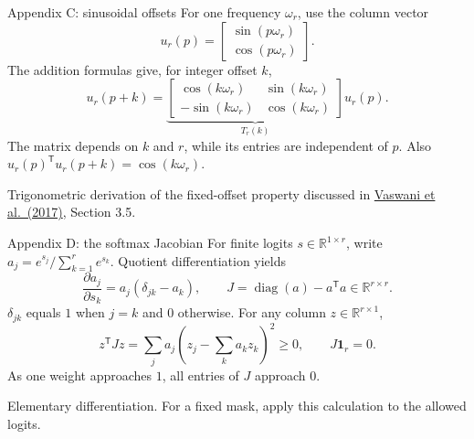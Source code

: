 \documentclass[aspectratio=169,11pt]{beamer}
\newcommand{\R}{\mathbb{R}}
\newcommand{\one}{\mathbf{1}}
\newcommand{\T}{\mathsf{T}}
\newcommand{\src}[1]{\par\vfill{\fontsize{7}{8.5}\selectfont\color{muted}#1}\par}
\newcommand{\paper}{\href{https://arxiv.org/abs/1706.03762}{Vaswani et al.\ (2017)}}
\DeclareMathOperator{\diag}{diag}
\begin{document}
\begin{frame}[t]{Appendix C: sinusoidal offsets}
For one frequency $\omega_r$, use the column vector
\[
 u_r(p)=\begin{bmatrix}\sin(p\omega_r)\\\cos(p\omega_r)\end{bmatrix}.
\]
The addition formulas give, for integer offset $k$,
\[
 u_r(p+k)=
 \underbrace{\begin{bmatrix}
 \cos(k\omega_r)&\sin(k\omega_r)\\
 -\sin(k\omega_r)&\cos(k\omega_r)
 \end{bmatrix}}_{T_r(k)}u_r(p).
\]
The matrix depends on $k$ and $r$, while its entries are independent of $p$.
Also $u_r(p)^{\T}u_r(p+k)=\cos(k\omega_r)$.
\src{Trigonometric derivation of the fixed-offset property discussed in \paper, Section 3.5.}
\end{frame}

\begin{frame}[t]{Appendix D: the softmax Jacobian}
For finite logits $s\in\R^{1\times r}$, write
$a_j=e^{s_j}/\sum_{k=1}^r e^{s_k}$. Quotient differentiation yields
\[
 \frac{\partial a_j}{\partial s_k}
   =a_j(\delta_{jk}-a_k),\qquad
 J=\diag(a)-a^{\T}a\in\R^{r\times r}.
\]
$\delta_{jk}$ equals $1$ when $j=k$ and $0$ otherwise.
For any column $z\in\R^{r\times1}$,
\[
 z^{\T}Jz=\sum_j a_j\left(z_j-\sum_k a_kz_k\right)^2\geq0,
 \qquad J\one_r=0.
\]
As one weight approaches $1$, all entries of $J$ approach $0$.
\src{Elementary differentiation. For a fixed mask, apply this calculation to the allowed logits.}
\end{frame}
\end{document}
